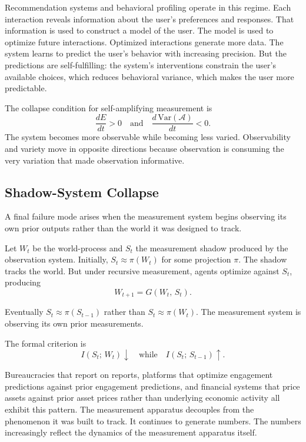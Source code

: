 \documentclass[12pt, a4paper]{article}
\theoremstyle{flyxion}
\newcommand{\cA}{\mathcal{A}}
\begin{document}
Recommendation systems and behavioral profiling operate in this regime. Each interaction reveals information about the user's preferences and responses. That information is used to construct a model of the user. The model is used to optimize future interactions. Optimized interactions generate more data. The system learns to predict the user's behavior with increasing precision. But the predictions are self-fulfilling: the system's interventions constrain the user's available choices, which reduces behavioral variance, which makes the user more predictable.

The collapse condition for self-amplifying measurement is
\[
  \frac{dE}{dt} > 0 \quad \text{and} \quad \frac{d\,\mathrm{Var}(\cA)}{dt} < 0.
\]
The system becomes more observable while becoming less varied. Observability and variety move in opposite directions because observation is consuming the very variation that made observation informative.

\subsection*{Shadow-System Collapse}

A final failure mode arises when the measurement system begins observing its own prior outputs rather than the world it was designed to track.

Let $W_t$ be the world-process and $S_t$ the measurement shadow produced by the observation system. Initially, $S_t \approx \pi(W_t)$ for some projection $\pi$. The shadow tracks the world. But under recursive measurement, agents optimize against $S_t$, producing
\[
  W_{t+1} = G(W_t,\, S_t).
\]

Eventually $S_t \approx \pi(S_{t-1})$ rather than $S_t \approx \pi(W_t)$. The measurement system is observing its own prior measurements.

The formal criterion is
\[
  I(S_t;\, W_t) \downarrow \quad \text{while} \quad I(S_t;\, S_{t-1}) \uparrow.
\]

Bureaucracies that report on reports, platforms that optimize engagement predictions against prior engagement predictions, and financial systems that price assets against prior asset prices rather than underlying economic activity all exhibit this pattern. The measurement apparatus decouples from the phenomenon it was built to track. It continues to generate numbers. The numbers increasingly reflect the dynamics of the measurement apparatus itself.
\end{document}
